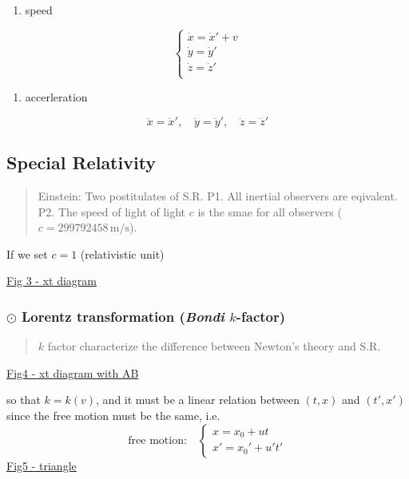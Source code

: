 \documentclass[12pt]{article}
\begin{document}
\begin{enumerate}
	\item speed

\end{enumerate}
    $$    \begin{cases}    \dot{x} = \dot{x}' + v\\    \dot{y} = \dot{y}'\\    \dot{z} = \dot{z}'\\    \end{cases}    $$

\begin{enumerate}
	\item accerleration

\end{enumerate}
    $$    \ddot{x} = \ddot{x}',    \quad \ddot{y} = \ddot{y}',    \quad \ddot{z} = \ddot{z}'    $$

\subsection{Special Relativity} %

\begin{quote}
	Einstein: Two postitulates of S.R.
P1. All inertial observers are eqivalent.
P2. The speed of light of light $c$ is the smae for all observers ($c=299792458\,\mathrm{m/s}$).
\end{quote}

If we set $c=1$ (relativistic unit)

\underline{Fig 3 - xt diagram}

\subsubsection{$\odot$ Lorentz transformation (\textit{Bondi} $k$-factor)} %

\begin{quote}
	$k$ factor characterize the difference between Newton's theory and S.R.
\end{quote}

\underline{Fig4 - xt diagram with AB}

so that $k=k(v)$, and it must be a linear relation between $(t,x)$ and $(t',x')$ since the free motion must be the same, i.e.
\begin{equation}
\text{free motion:}\quad
\begin{cases}
x = x_0 + u t\\
x' = x_0' + u' t'
\end{cases}
\end{equation}
\underline{Fig5 - triangle} 
\end{document}
